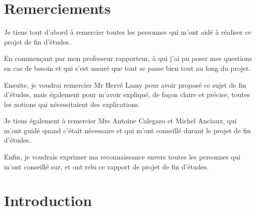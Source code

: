 \documentclass[11pt]{article}
\newenvironment{remerciements}
  {
   \thispagestyle{empty}%
   \vspace*{\stretch{1}}%
   \itshape             %
  }
  {\par %
   \vspace{\stretch{3}} %
   \clearpage           %
  }
\begin{document}
\section*{Remerciements}
\begin{remerciements}
    Je tiens tout d'abord à remercier toutes les personnes qui m'ont aidé à réaliser ce projet de fin d'études.\\
    \par
    En commençant par mon professeur rapporteur, à qui j'ai pu poser mes questions en cas de besoin et qui s'est assuré que tout se passe bien tout au long du projet.\\
    \par
    Ensuite, je voudrai remercier Mr Hervé Lamy pour avoir proposé ce sujet de fin d'études, mais également pour m'avoir expliqué, de façon claire et précise, toutes les notions qui nécessitaient des explications.\\
    \par
    Je tiens également à remercier Mrs Antoine Calegaro et Michel Anciaux, qui m'ont guidé quand c'était nécessaire et qui m'ont conseillé durant le projet de fin d'études.\\
    \par
    Enfin, je voudrais exprimer ma reconnaissance envers toutes les personnes qui m'ont conseillé sur, et ont relu ce rapport de projet de fin d'études.
\end{remerciements}

\newpage

\tableofcontents

\newpage

\section{Introduction}
\end{document}
